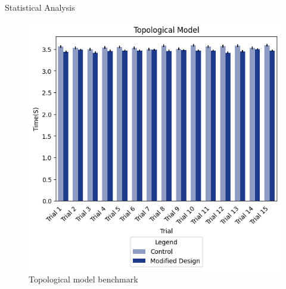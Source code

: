 \documentclass[final, 16pt]{beamer}
\newlength{\colwidth}
\begin{document}
\begin{frame}[t]
\begin{columns}[t]
\begin{column}{\colwidth}
\begin{block}{Statistical Analysis}
    \vspace*{-1.3cm}
    \begin{multicols}{2}
      \begin{figure}[H]
        \centering
        \includegraphics[width=1.05\linewidth, height=1.25\linewidth]{img/Topological_Model_Benchmark.png}
        \caption{Topological model benchmark}
        \label{fig:topological-model-benchmark}
      \end{figure}
      
      \begin{figure}[H]
        

\end{figure}
\end{multicols}
\end{block}
\end{column}
\end{columns}
\end{frame}
\end{document}
